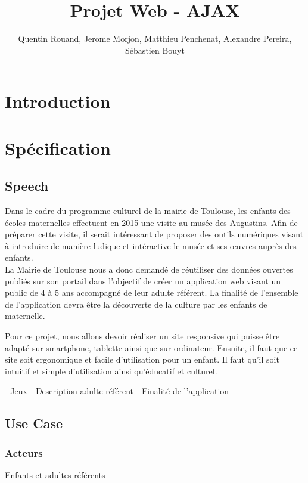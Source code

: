 \documentclass[12pt,a4paper]{report}
\author{Quentin Rouand, Jerome Morjon, Matthieu Penchenat, Alexandre Pereira, Sébastien Bouyt}
\affil{Université Toulouse, Jean Jaurès - L3 MIASHS - ProjetWeb}
\begin{document}
\title{Projet Web - AJAX} 
\maketitle

\renewcommand{\contentsname}{Sommaire}
\tableofcontents

\chapter*{Introduction}

\chapter{Spécification}

\section{Speech}

Dans le cadre du programme culturel de la mairie de Toulouse, les enfants des écoles maternelles effectuent en 2015 une visite au musée des Augustins. Afin de préparer cette visite, il serait intéressant de proposer des outils numériques visant à introduire de manière ludique et intéractive le musée et ses œuvres auprès des enfants.\\

La Mairie de Toulouse nous a donc demandé de réutiliser des données ouvertes publiés sur son portail dans l'objectif de créer un application web visant un public de 4 à 5 ans accompagné de leur adulte référent. La finalité de l'ensemble de l'application devra être la découverte de la culture par les enfants de maternelle.

Pour ce projet, nous allons devoir réaliser un site responsive qui puisse être adapté sur smartphone, tablette ainsi que sur ordinateur. Ensuite, il faut que ce site soit ergonomique et facile d'utilisation pour un enfant. Il faut qu'il soit intuitif et simple d'utilisation ainsi qu'éducatif et culturel.

- Jeux
- Description adulte référent
- Finalité de l'application


\section{Use Case}

\subsection{Acteurs}
Enfants et adultes référents
\end{document}

